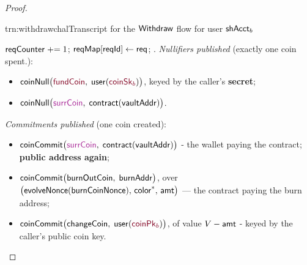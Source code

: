 \begin{proof}
\begin{itemize} [label=$\blacksquare$]
\begin{CktBox}{trn:withdrawchal}{Transcript for the $\mathsf{Withdraw}$ flow for user $\mathsf{shAcct}_b$}
   \upd{$\cktStartWithdraw$}
\begin{OutList}
\oitem{\Dvault} $\mathsf{reqCounter} \mathrel{+}= 1$; \; $\mathsf{reqMap}[\mathsf{reqId}] \gets \mathsf{req}$; \;
  .
\oitem{\Dshd} \emph{Nullifiers published} (exactly one coin spent.):
  \begin{itemize}[nosep,leftmargin=1.3em,topsep=1pt]
  \item \bluedot $\coinNull\bigl(\secret{\coinFund},\; \mathsf{user}(\secret{\coinsk_b})\bigr)$,
        keyed by the caller's \textbf{secret};
  \item \bluedot $\coinNull\bigl(\freshrn{\coinIn},\; \mathsf{contract}(\vaultAddr)\bigr)$.
  \end{itemize}
  \emph{Commitments published} (one  coin created):
  \begin{itemize}[nosep,leftmargin=1.3em,topsep=1pt]
  \item \bluedot $\coinCommit\bigl(\freshrn{\coinIn},\; \mathsf{contract}(\vaultAddr)\bigr)$ - the wallet
        paying the contract; \textbf{public address again};
  \item \bluedot $\mathsf{coinCommit}\bigl(\mathsf{burnOutCoin},\; \mathsf{burnAddr}\bigr)$, over
        $\bigl(\mathsf{evolveNonce}(\mathsf{burnCoinNonce}),\, \mathsf{color}^{*},\, \mathsf{amt}\bigr)$ --- the contract
        paying the burn address;
  \item \bluedot $\coinCommit\bigl(\coinChange,\; \mathsf{user}(\secret{\coinpk_b})\bigr)$, of value
        $V - \mathsf{amt}$ - keyed by the caller's public coin key.
  \end{itemize}
\end{OutList}
\end{CktBox}
\end{itemize}
\end{proof}

